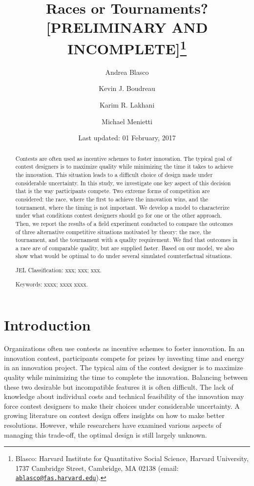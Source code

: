 \documentclass[12pt,]{article}
\title{Races or Tournaments? {[}PRELIMINARY AND INCOMPLETE{]}\thanks{Blasco: Harvard Institute for Quantitative Social Science, Harvard
University, 1737 Cambridge Street, Cambridge, MA 02138 (email:
\href{mailto:ablasco@fas.harvard.edu}{\nolinkurl{ablasco@fas.harvard.edu}}).}}
\author{Andrea Blasco \and Kevin J. Boudreau \and Karim R. Lakhani \and Michael Menietti}
\date{Last updated: 01 February, 2017}
\begin{document}
\maketitle
\begin{abstract}
Contests are often used as incentive schemes to foster innovation. The
typical goal of contest designers is to maximize quality while
minimizing the time it takes to achieve the innovation. This situation
leads to a difficult choice of design made under considerable
uncertainty. In this study, we investigate one key aspect of this
decision that is the way participants compete. Two extreme forms of
competition are considered: the race, where the first to achieve the
innovation wins, and the tournament, where the timing is not important.
We develop a model to characterize under what conditions contest
designers should go for one or the other approach. Then, we report the
results of a field experiment conducted to compare the outcomes of three
alternative competitive situations motivated by theory: the race, the
tournament, and the tournament with a quality requirement. We find that
outcomes in a race are of comparable quality, but are supplied faster.
Based on our model, we also show what would be optimal to do under
several simulated counterfactual situations.

\smallskip\noindent 
JEL Classification: xxx; xxx; xxx.

\smallskip\noindent 
Keywords: xxxx; xxxx xxxx.
\end{abstract}


\clearpage
\tableofcontents
\setcounter{tocdepth}{2}
\clearpage

\section{Introduction}\label{introduction}

Organizations often use contests as incentive schemes to foster
innovation. In an innovation contest, participants compete for prizes by
investing time and energy in an innovation project. The typical aim of
the contest designer is to maximize quality while minimizing the time to
complete the innovation. Balancing between these two desirable but
incompatible features it is often difficult. The lack of knowledge about
individual costs and technical feasibility of the innovation may force
contest designers to make their choices under considerable uncertainty.
A growing literature on contest design offers insights on how to make
better resolutions. However, while researchers have examined various
aspects of managing this trade-off, the optimal design is still largely
unknown.
\end{document}

